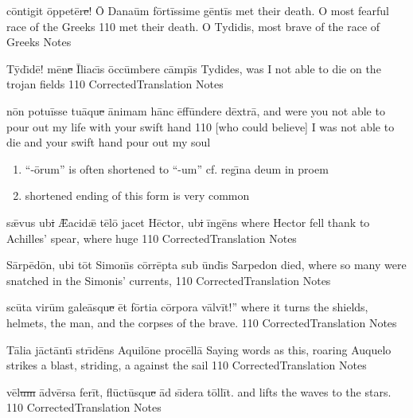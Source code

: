 \latline
  {c\=ont\-ig\-it \=opp\-et\=er\sout{e}!  \={\macron O} D\-an\-a\=um f\=ort\=iss\-im\-e g\=ent\=is}
  { met their death.  O most fearful race of the Greeks }
  {110}
  { met their death.  O Tydidis, most brave of the race of Greeks }
  { Notes }


\latline
  {T\={\macron y}d\={\macron \i}d\={\macron e}!  m\={\macron e}n\sout{e }\={\macron I}l\-i\-ac\={\macron \i}s \=occ\=umb\-er\-e c\=amp\={\macron \i}s}
  { Tydides, was I not able to die on the trojan fields }
  {110}
  { CorrectedTranslation }
  { Notes }




\latline
  {n\={\macron o}n p\-ot\-u\=iss\-e t\-u\={\macron a}qu\sout{e }\=an\-im\-am h\=anc \=eff\=und\-er\-e d\=extr\={\macron a},}
  { and were you not able to pour out my life with your swift hand }
  {110}
  { [who could believe] I was not able to die and your swift hand pour out my soul }
  { \begin{enumerate}
  	\item ``-\={o}rum'' is often shortened to ``-um'' cf. reg\={\i}na deum in proem
  	\item shortened ending of this form is very common
  \end{enumerate} }


\latline
  {s\={\ae}v\-us \-ub\sout{i }\={\AE}a\-c\-id\={\ae} t\={\macron e}l\={\macron o} j\-ac\-et H\=ect\-or, \-ub\sout{i }\=ing\={\macron e}ns}
  { where Hector fell thank to Achilles' spear, where huge }
  {110}
  { CorrectedTranslation }
  { Notes }


\latline
  {S\=arp\={\macron e}d\={\macron o}n, \-ub\-i t\=ot S\-im\-on\={\macron \i}s c\=orr\=ept\-a s\-ub \=und\={\macron \i}s}
  { Sarpedon died, where so many were snatched in the Simonis' currents,  }
  {110}
  { CorrectedTranslation }
  { Notes }




\latline
  {sc\={\macron u}t\-a v\-ir\=um g\-al\-e\={\macron a}squ\sout{e }\=et f\=ort\-i\-a c\=orp\-or\-a v\=alv\=it!''}
  { where it turns the shields, helmets, the man, and the corpses of the brave. }
  {110}
  { CorrectedTranslation }
  { Notes }


\latline
  {T\={\macron a}l\-i\-a j\=act\=ant\={\macron \i} str\={\macron \i}d\={\macron e}ns \-Aqu\-il\={\macron o}n\-e pr\-oc\=ell\=a}
  { Saying words as this, roaring Auquelo strikes a blast, striding, a against the sail }
  {110}
  { CorrectedTranslation }
  { Notes }


\latline
  {v\={\macron e}l\sout{um }\=adv\=ers\-a f\-er\=it, fl\={\macron u}ct\={\macron u}squ\sout{e }\=ad s\={\macron \i}d\-er\-a t\=oll\=it.}
  {  and lifts the waves to the stars. }
  {110}
  { CorrectedTranslation }
  { Notes }




